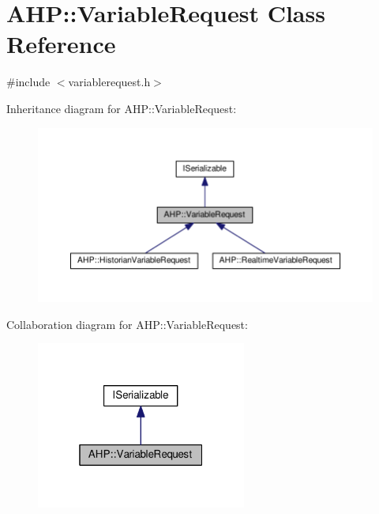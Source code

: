 \hypertarget{class_a_h_p_1_1_variable_request}{}\section{A\+H\+P\+:\+:Variable\+Request Class Reference}
\label{class_a_h_p_1_1_variable_request}


{\ttfamily \#include $<$variablerequest.\+h$>$}



Inheritance diagram for A\+H\+P\+:\+:Variable\+Request\+:
\nopagebreak
\begin{figure}[H]
\begin{center}
\leavevmode
\includegraphics[width=350pt]{class_a_h_p_1_1_variable_request__inherit__graph}
\end{center}
\end{figure}


Collaboration diagram for A\+H\+P\+:\+:Variable\+Request\+:
\nopagebreak
\begin{figure}[H]
\begin{center}
\leavevmode
\includegraphics[width=196pt]{class_a_h_p_1_1_variable_request__coll__graph}
\end{center}
\end{figure}
